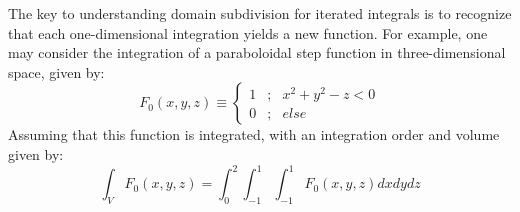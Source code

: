 The key to understanding domain subdivision for iterated integrals is to recognize that each one-dimensional integration yields a new function. For example, one may consider the integration of a paraboloidal step function in three-dimensional space, given by:
\begin{equation}
{F_0}\left( {x,y,z} \right) \equiv \left\{ {\begin{array}{*{20}{c}}
1&;&{{x^2} + {y^2} - z < 0}\\
0&;&{else}
\end{array}} \right.
\label{eq:int-paraboloidal-step}
\end{equation}
Assuming that this function is integrated, with an integration order and volume given by:
\[\int_V {{F_0}\left( {x,y,z} \right)}  = \int_0^2 {\int_{ - 1}^1 {\int_{ - 1}^1 {{F_0}\left( {x,y,z} \right)dx} dy} dz} \]

